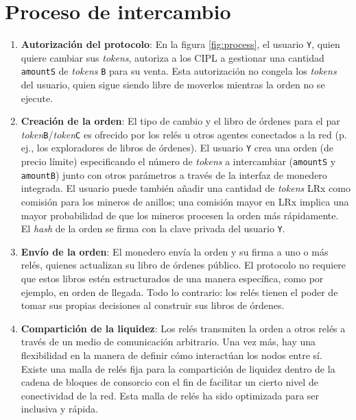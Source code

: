\documentclass[UTF8,nofonts]{article}
\begin{document}
\begin{multicols}{2}
\begin{itemize}
\end{itemize}


\section{Proceso de intercambio\label{sec:process}}



\begin{enumerate} 

\item \textbf{Autorización del protocolo}: En la figura \ref{fig:process}, el usuario \verb|Y|, quien quiere cambiar sus \textit{tokens}, autoriza a los CIPL a gestionar una cantidad \verb|amountS| de \textit{tokens} \verb|B| para su venta. Esta autorización no congela los \textit{tokens} del usuario, quien sigue siendo libre de moverlos mientras la orden no se ejecute.

\item \textbf{Creación de la orden}: El tipo de cambio y el libro de órdenes para el par \textit{token}\verb|B|/\textit{token}\verb|C| es ofrecido por los relés u otros agentes conectados a la red (p. ej., los exploradores de libros de órdenes). El usuario \verb|Y| crea una orden (de precio límite) especificando el número de \textit{tokens} a intercambiar (\verb|amountS| y \verb|amountB|) junto con otros parámetros a través de la interfaz de monedero integrada. El usuario puede también añadir una cantidad de \textit{tokens} LRx como comisión para los mineros de anillos; una comisión mayor en LRx implica una mayor probabilidad de que los mineros procesen la orden más rápidamente. El \textit{hash} de la orden se firma con la clave privada del usuario \verb|Y|.

\item \textbf{Envío de la orden}: El monedero envía la orden y su firma a uno o más relés, quienes actualizan su libro de órdenes público. El protocolo no requiere que estos libros estén estructurados de una manera específica, como por ejemplo, en orden de llegada. Todo lo contrario: los relés tienen el poder de tomar sus propias decisiones al construir sus libros de órdenes.

\item \textbf{Compartición de la liquidez}: Los relés transmiten la orden a otros relés a través de un medio de comunicación arbitrario. Una vez más, hay una flexibilidad en la manera de definir cómo interactúan los nodos entre sí. Existe una malla de relés fija para la compartición de liquidez dentro de la cadena de bloques de consorcio con el fin de facilitar un cierto nivel de conectividad de la red. Esta malla de relés ha sido optimizada para ser inclusiva y rápida.


\end{enumerate}
\end{multicols}
\end{document}
